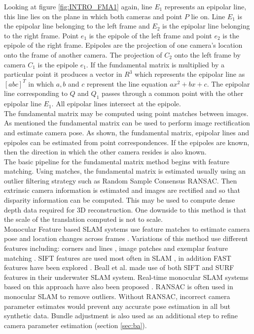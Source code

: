 Looking at figure \ref{fig:INTRO_FMA1} again, line $E_1$ represents an epipolar line, this line lies on the plane in which both cameras and point $P$ lie on. Line $E_1$ is the epipolar line belonging to the left frame and $E_2$ is the epipolar line belonging to the right frame. Point $e_1$ is the epipole of the left frame and point $e_2$ is the epipole of the right frame. Epipoles are the projection of one camera's location onto the frame of another camera. The projection of $C_2$ onto the left frame by camera $C_1$ is the epipole $e_1$. If the fundamental matrix is multiplied by a particular point it produces a vector in $R^3$ which represents the epipolar line as $[a b c]^T$ in which $a,b$ and $c$ represent the line equation $ax^2 + bx + c$. The epipolar line corresponding to $Q$ and $Q_1$ passes through a common point with the other epipolar line $E_1$. All epipolar lines intersect at the epipole. \\

The fundamental matrix may be computed using point matches between images. As mentioned the fundamental matrix can be used to perform image rectification and estimate camera pose. As shown, the fundamental matrix, epipolar lines and epipoles can be estimated from point correspondences. If the epipoles are known, then the direction in which the other camera resides is also known. \\

The basic pipeline for the fundamental matrix method begins with feature matching. Using matches, the fundamental matrix is estimated usually using an outlier filtering strategy such as Random Sample Consensus RANSAC. Then extrinsic camera information is estimated and images are rectified and so that disparity information can be computed. This may be used to compute dense depth data required for 3D reconstruction. One downside to this method is that the scale of the translation computed is not to scale. \\


Monocular Feature based SLAM systems use feature matches to estimate camera pose and location changes across frames \cite{Davison02Simultaneous}. Variations of this method use different features including: corners and lines \cite{Jeong06Visual}, image patches \cite{Silveira08Efficient} and exemplar feature matching \cite{Chekhlov07Robust}. SIFT features are used most often in SLAM \cite{Jensfelt06Framework,Pollefeys08Detailed,Beall11Bundle,Eudes10Fast}, in addition FAST features have been explored \cite{Kundu10Realtime,Leelasawassuk133d,Konolige10View,Konolige08Frameslam}. Beall et al. \cite{Beall11Bundle} made use of both SIFT and SURF features in their underwater SLAM system. Real-time monocular SLAM systems based on this approach have also been proposed \cite{Chekhlov07Robust,Pollefeys08Detailed}. RANSAC is often used in monocular SLAM \cite{Eudes10Fast,Kundu10Realtime,Konolige10View,Konolige08Frameslam,Pradeep13Monofusion} to remove outliers. Without RANSAC, incorrect camera parameter estimates would prevent any accurate pose estimation in all but synthetic data. Bundle adjustment is also used as an additional step to refine camera parameter estimation \cite{Eudes10Fast} (section \ref{sec:ba}).  \\


